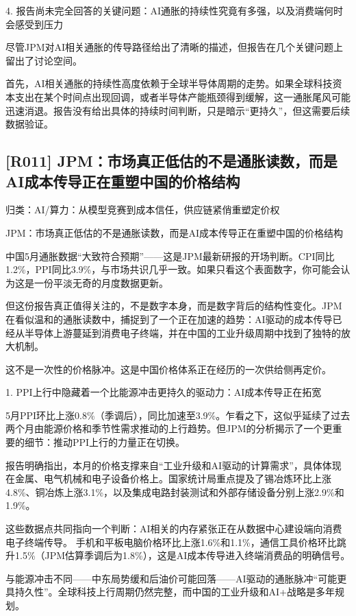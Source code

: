 \documentclass[11pt]{ctexart}
\begin{document}
4. 报告尚未完全回答的关键问题：AI通胀的持续性究竟有多强，以及消费端何时会感受到压力

尽管JPM对AI相关通胀的传导路径给出了清晰的描述，但报告在几个关键问题上留出了讨论空间。

首先，AI相关通胀的持续性高度依赖于全球半导体周期的走势。如果全球科技资本支出在某个时间点出现回调，或者半导体产能瓶颈得到缓解，这一通胀尾风可能迅速消退。报告没有给出具体的持续时间判断，只是暗示“更持久”，但这需要后续数据验证。

\subsection{[R011] JPM：市场真正低估的不是通胀读数，而是AI成本传导正在重塑中国的价格结构}
{\small\color{refgray}归类：AI/算力：从模型竞赛到成本信任，供应链紧俏重塑定价权}

JPM：市场真正低估的不是通胀读数，而是AI成本传导正在重塑中国的价格结构

中国5月通胀数据“大致符合预期”——这是JPM最新研报的开场判断。CPI同比1.2\%，PPI同比3.9\%，与市场共识几乎一致。如果只看这个表面数字，你可能会认为这是一份平淡无奇的月度数据更新。

但这份报告真正值得关注的，不是数字本身，而是数字背后的结构性变化。JPM在看似温和的通胀读数中，捕捉到了一个正在加速的趋势：AI驱动的成本传导已经从半导体上游蔓延到消费电子终端，并在中国的工业升级周期中找到了独特的放大机制。

这不是一次性的价格脉冲。这是中国价格体系正在经历的一次供给侧再定价。

1. PPI上行中隐藏着一个比能源冲击更持久的驱动力：AI成本传导正在拓宽

5月PPI环比上涨0.8\%（季调后），同比加速至3.9\%。乍看之下，这似乎延续了过去两个月由能源价格和季节性需求推动的上行趋势。但JPM的分析揭示了一个更重要的细节：推动PPI上行的力量正在切换。

报告明确指出，本月的价格支撑来自“工业升级和AI驱动的计算需求”，具体体现在金属、电气机械和电子设备价格上。国家统计局重点提及了锡冶炼环比上涨4.8\%、铜冶炼上涨3.1\%，以及集成电路封装测试和外部存储设备分别上涨2.9\%和1.9\%。

这些数据点共同指向一个判断：AI相关的内存紧张正在从数据中心建设端向消费电子终端传导。 手机和平板电脑价格环比上涨1.6\%和1.1\%，通信工具价格环比跳升1.5\%（JPM估算季调后为1.8\%），这是AI成本传导进入终端消费品的明确信号。

与能源冲击不同——中东局势缓和后油价可能回落——AI驱动的通胀脉冲“可能更具持久性”。全球科技上行周期仍然完整，而中国的工业升级和AI+战略是多年规划。
\end{document}
